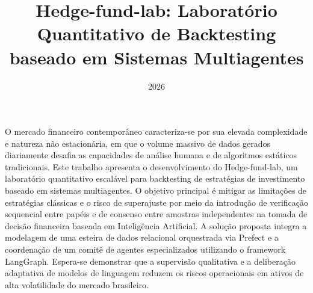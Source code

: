 \documentclass{eic-bcc-tcc}
\title{Hedge-fund-lab: Laboratório Quantitativo de Backtesting baseado em Sistemas Multiagentes}
\date{2026}
\newcommand{\verify}[1]{{\color{blue} {#1}}}
\begin{document}
\maketitle


\makeapproval

\begin{resumo}
O mercado financeiro contemporâneo caracteriza-se por sua elevada complexidade e natureza não estacionária, em que o volume massivo de dados gerados diariamente desafia as capacidades de análise humana e de algoritmos estáticos tradicionais. Este trabalho apresenta o desenvolvimento do Hedge-fund-lab, um laboratório quantitativo escalável para backtesting de estratégias de investimento baseado em sistemas multiagentes. O objetivo principal é mitigar as limitações de estratégias clássicas e o risco de superajuste por meio da introdução de verificação sequencial entre papéis e de consenso entre amostras independentes na tomada de decisão financeira baseada em Inteligência Artificial. A solução proposta integra a modelagem de uma esteira de dados relacional orquestrada via Prefect e a coordenação de um comitê de agentes especializados utilizando o framework LangGraph. \verify{Espera-se demonstrar que a supervisão qualitativa e a deliberação adaptativa de modelos de linguagem reduzem os riscos operacionais em ativos de alta volatilidade do mercado brasileiro.}
\end{resumo}
\end{document}
